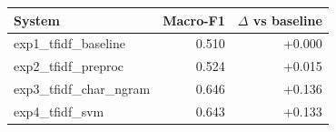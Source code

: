 \begin{tabular}{lrr}
\toprule
System & Macro-F1 & $\Delta$ vs baseline \\
\midrule
exp1_tfidf_baseline & 0.510 & +0.000 \\
exp2_tfidf_preproc & 0.524 & +0.015 \\
exp3_tfidf_char_ngram & 0.646 & +0.136 \\
exp4_tfidf_svm & 0.643 & +0.133 \\
\bottomrule
\end{tabular}